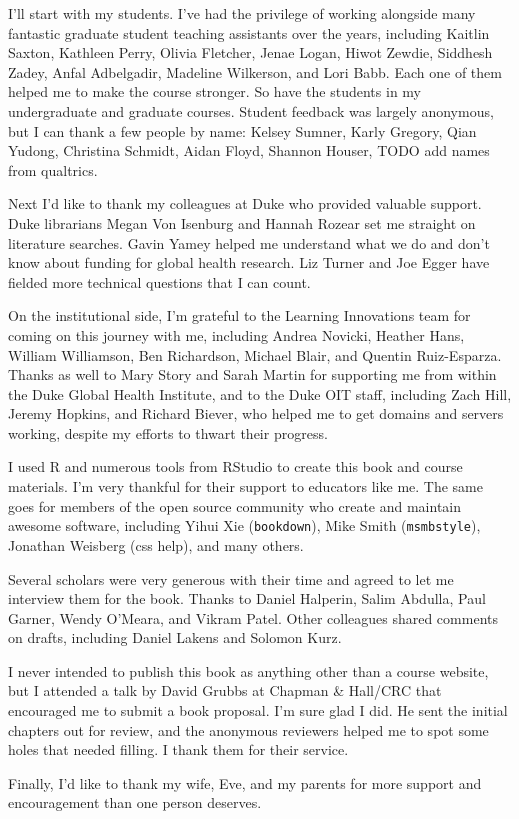 \documentclass[justified,twoside,symmetric,]{tufte-book}
\begin{document}
I'll start with my students. I've had the privilege of working alongside many fantastic graduate student teaching assistants over the years, including Kaitlin Saxton, Kathleen Perry, Olivia Fletcher, Jenae Logan, Hiwot Zewdie, Siddhesh Zadey, Anfal Adbelgadir, Madeline Wilkerson, and Lori Babb. Each one of them helped me to make the course stronger. So have the students in my undergraduate and graduate courses. Student feedback was largely anonymous, but I can thank a few people by name: Kelsey Sumner, Karly Gregory, Qian Yudong, Christina Schmidt, Aidan Floyd, Shannon Houser, TODO add names from qualtrics.

Next I'd like to thank my colleagues at Duke who provided valuable support. Duke librarians Megan Von Isenburg and Hannah Rozear set me straight on literature searches. Gavin Yamey helped me understand what we do and don't know about funding for global health research. Liz Turner and Joe Egger have fielded more technical questions that I can count.

On the institutional side, I'm grateful to the Learning Innovations team for coming on this journey with me, including Andrea Novicki, Heather Hans, William Williamson, Ben Richardson, Michael Blair, and Quentin Ruiz-Esparza. Thanks as well to Mary Story and Sarah Martin for supporting me from within the Duke Global Health Institute, and to the Duke OIT staff, including Zach Hill, Jeremy Hopkins, and Richard Biever, who helped me to get domains and servers working, despite my efforts to thwart their progress.

I used R and numerous tools from RStudio to create this book and course materials. I'm very thankful for their support to educators like me. The same goes for members of the open source community who create and maintain awesome software, including Yihui Xie (\texttt{bookdown}), Mike Smith (\texttt{msmbstyle}), Jonathan Weisberg (css help), and many others.

Several scholars were very generous with their time and agreed to let me interview them for the book. Thanks to Daniel Halperin, Salim Abdulla, Paul Garner, Wendy O'Meara, and Vikram Patel. Other colleagues shared comments on drafts, including Daniel Lakens and Solomon Kurz.

I never intended to publish this book as anything other than a course website, but I attended a talk by David Grubbs at Chapman \& Hall/CRC that encouraged me to submit a book proposal. I'm sure glad I did. He sent the initial chapters out for review, and the anonymous reviewers helped me to spot some holes that needed filling. I thank them for their service.

Finally, I'd like to thank my wife, Eve, and my parents for more support and encouragement than one person deserves.


\end{document}
